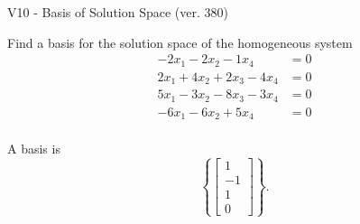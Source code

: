 \begin{exercise}
  \begin{exerciseTitle}V10 - Basis of Solution Space (ver. 380)\end{exerciseTitle}
  \begin{exerciseStatement}
    Find a basis for the solution space of the homogeneous system 
\begin{align*}
 -2 x_ 1 -2 x_ 2 -1 x_ 4 &= 0  \\ 
  2 x_ 1 + 4 x_ 2 + 2 x_ 3 -4 x_ 4 &= 0  \\ 
  5 x_ 1 -3 x_ 2 -8 x_ 3 -3 x_ 4 &= 0  \\ 
  -6 x_ 1 -6 x_ 2 + 5 x_ 4 &= 0  \\ 
 \end{align*}


 
  \end{exerciseStatement}

  \begin{exerciseAnswer}
   A basis is   
\[\left\{\left[\begin{array}{c}
1 \\
-1 \\
1 \\
0
\end{array}\right]\right\}.\]

  


  \end{exerciseAnswer}
\end{exercise}